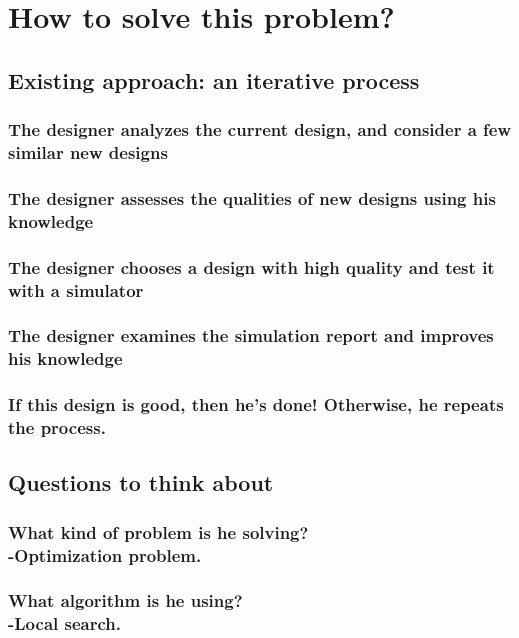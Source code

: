 \documentclass[12pt]{article}
\theoremstyle{definition}
\begin{document}
\section{How to solve this problem?}
\pagebreak

\subsection{Existing approach: an iterative process}
\subsubsection{The designer analyzes the current design, and consider a few similar new designs}
\subsubsection{The designer assesses the qualities of new designs using his knowledge}
\subsubsection{The designer chooses a design with high quality and test it with a simulator}
\subsubsection{The designer examines the simulation report and improves his knowledge}
\subsubsection{If this design is good, then he's done! Otherwise, he repeats the process.}
\begin{figure}[h]
  \centering
  \begin{subfigure}
    {\texttt{[image: topologies]}}
  \end{subfigure}
\end{figure}
\pagebreak

\subsection{Questions to think about}
\subsubsection{What kind of problem is he solving? \\ -Optimization problem.}
\subsubsection{What algorithm is he using? \\ -Local search.}
\end{document}
